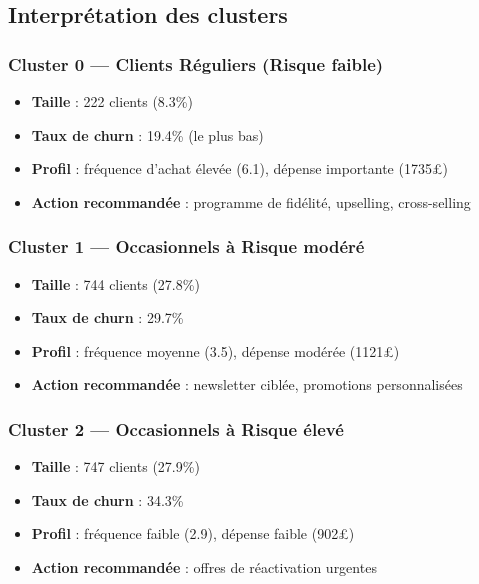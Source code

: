 \documentclass[11pt,a4paper]{article}
\begin{document}
\subsection{Interprétation des clusters}

\subsubsection{Cluster 0 — Clients Réguliers (Risque faible)}
\begin{itemize}
    \item \textbf{Taille} : 222 clients (8.3\%)
    \item \textbf{Taux de churn} : 19.4\% (le plus bas)
    \item \textbf{Profil} : fréquence d'achat élevée (6.1), dépense importante (1735£)
    \item \textbf{Action recommandée} : programme de fidélité, upselling, cross-selling
\end{itemize}

\subsubsection{Cluster 1 — Occasionnels à Risque modéré}
\begin{itemize}
    \item \textbf{Taille} : 744 clients (27.8\%)
    \item \textbf{Taux de churn} : 29.7\%
    \item \textbf{Profil} : fréquence moyenne (3.5), dépense modérée (1121£)
    \item \textbf{Action recommandée} : newsletter ciblée, promotions personnalisées
\end{itemize}

\subsubsection{Cluster 2 — Occasionnels à Risque élevé}
\begin{itemize}
    \item \textbf{Taille} : 747 clients (27.9\%)
    \item \textbf{Taux de churn} : 34.3\%
    \item \textbf{Profil} : fréquence faible (2.9), dépense faible (902£)
    \item \textbf{Action recommandée} : offres de réactivation urgentes
\end{itemize}
\end{document}

